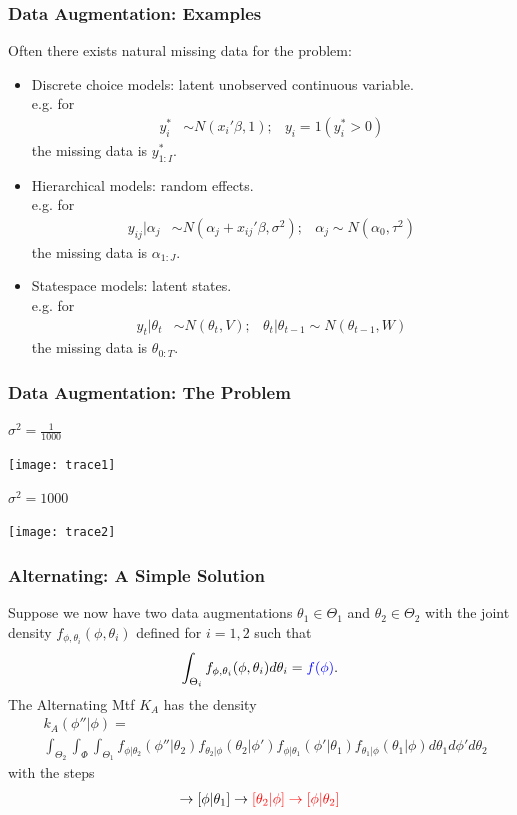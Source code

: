 \documentclass[xcolor=dvipsnames]{beamer}
\begin{document}
\begin{frame}
\frametitle{Data Augmentation: Examples}

Often there exists natural missing data for the problem:
\begin{itemize}
\item Discrete choice models: latent unobserved continuous variable.\\
e.g. for 
\begin{align*}
y_i^*&\sim N(x_i'\beta,1); &y_i=1(y_i^*>0)
\end{align*}
the missing data is $y_{1:I}^*$.
\pause\item Hierarchical models: random effects.\\
e.g. for
\begin{align*}
y_{ij}|\alpha_j&\sim N(\alpha_j + x_{ij}'\beta, \sigma^2); &\alpha_j\sim N(\alpha_0,\tau^2)
\end{align*}
the missing data is $\alpha_{1:J}$.
\pause\item Statespace models: latent states.\\
e.g. for
\begin{align*}
y_t|\theta_t&\sim N(\theta_t,V); &\theta_t|\theta_{t-1}\sim N(\theta_{t-1},W)
\end{align*}
the missing data is $\theta_{0:T}$.
\end{itemize}
\end{frame}

\begin{frame}
\frametitle{Data Augmentation: The Problem}
$\sigma^2=\frac{1}{1000}$
\begin{center}
\texttt{[image: trace1]}\\
\end{center}
$\sigma^2=1000$
\begin{center}
\texttt{[image: trace2]}
\end{center}
\end{frame}

\begin{frame}
\frametitle{Alternating: A Simple Solution}
Suppose we now have two data augmentations $\theta_1\in\Theta_1$ and $\theta_2\in\Theta_2$ with the joint density $f_{\phi,\theta_i}(\phi,\theta_i)$ defined for $i=1,2$ such that 
\begin{align*}
\int_{\Theta_i}f_{\phi,\theta_i}(\phi,\theta_i)d\theta_i = {\color{blue}f(\phi)}.
\end{align*}
The Alternating Mtf $K_A$ has the density
\begin{align*}
&k_A(\phi''|\phi) = \\
&\int_{\Theta_2}\int_{\Phi}\int_{\Theta_1}f_{\phi|\theta_2}(\phi''|\theta_2)f_{\theta_2|\phi}(\theta_2|\phi')f_{\phi|\theta_1}(\phi'|\theta_1)f_{\theta_1|\phi}(\theta_1|\phi)d\theta_1d\phi'd\theta_2
\end{align*}
with the steps
\begin{align*}
[\theta_1|\phi] \to [\phi|\theta_1] \to {\color{red}[\theta_2|\phi] \to [\phi|\theta_2]}
\end{align*}
\end{frame}
\end{document}
